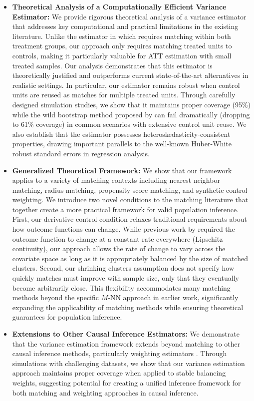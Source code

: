 \documentclass{mytemplate}
\begin{document}
\begin{itemize}
\item \textbf{Theoretical Analysis of a Computationally Efficient Variance Estimator:} We provide rigorous theoretical analysis of a variance estimator that addresses key computational and practical limitations in the existing literature. Unlike the estimator in \cite{abadie2006large} which requires matching within both treatment groups, our approach only requires matching treated units to controls, making it particularly valuable for ATT estimation with small treated samples. Our analysis demonstrates that this estimator is theoretically justified and outperforms current state-of-the-art alternatives in realistic settings. In particular, our estimator remains robust when control units are reused as matches for multiple treated units. Through carefully designed simulation studies, we show that it maintains proper coverage (95\%) while the wild bootstrap method proposed by \cite{otsu2017bootstrap} can fail dramatically (dropping to 61\% coverage) in common scenarios with extensive control unit reuse. We also establish that the estimator possesses heteroskedasticity-consistent properties, drawing important parallels to the well-known Huber-White \cite{white1980heteroskedasticity} robust standard errors in regression analysis.

\item \textbf{Generalized Theoretical Framework:} We show that our framework applies to a variety of matching contexts including nearest neighbor matching, radius matching, propensity score matching, and synthetic control weighting. We introduce two novel conditions to the matching literature that together create a more practical framework for valid population inference. First, our derivative control condition relaxes traditional requirements about how outcome functions can change. While previous work by \cite{abadie2006large} required the outcome function to change at a constant rate everywhere (Lipschitz continuity), our approach allows the rate of change to vary across the covariate space as long as it is appropriately balanced by the size of matched clusters. Second, our shrinking clusters assumption does not specify how quickly matches must improve with sample size, only that they eventually become arbitrarily close. This flexibility accommodates many matching methods beyond the specific $M$-NN approach in earlier work, significantly expanding the applicability of matching methods while ensuring theoretical guarantees for population inference.

\item \textbf{Extensions to Other Causal Inference Estimators:} We demonstrate that the variance estimation framework extends beyond matching to other causal inference methods, particularly weighting estimators \cite{zubizarreta2015stable, wang_minimal_2019}. Through simulations with challenging datasets, we show that our variance estimation approach maintains proper coverage when applied to stable balancing weights, suggesting potential for creating a unified inference framework for both matching and weighting approaches in causal inference.
\end{itemize}
\end{document}

